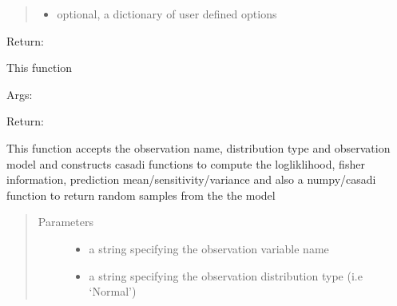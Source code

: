 \documentclass[letterpaper,10pt,english,openany,oneside]{sphinxmanual}
\begin{document}
\begin{fulllineitems}
\begin{fulllineitems}
\begin{quote}
\begin{description}
\begin{itemize}
\item {} 
 \textendash{} optional,  a dictionary of user defined options

\end{itemize}

\end{description}\end{quote}

Return:

\end{fulllineitems}


\begin{fulllineitems}
\label{\detokenize{nloed:nloed.model.Model.evaluate}}
This function

Args:

Return:

\end{fulllineitems}


\begin{fulllineitems}
\label{\detokenize{nloed:nloed.model.Model._get_distribution_functions}}
This function accepts the observation name, distribution type
and observation model and constructs casadi functions to compute
the logliklihood, fisher information, prediction mean/sensitivity/variance
and also a numpy/casadi function to return random samples from the the model
\begin{quote}\begin{description}
\item[{Parameters}] \leavevmode\begin{itemize}
\item {} 
 \textendash{} a string specifying the observation variable name

\item {} 
 \textendash{} a string specifying the observation distribution type (i.e ‘Normal’)


\end{itemize}
\end{description}
\end{quote}
\end{fulllineitems}
\end{fulllineitems}
\end{document}
